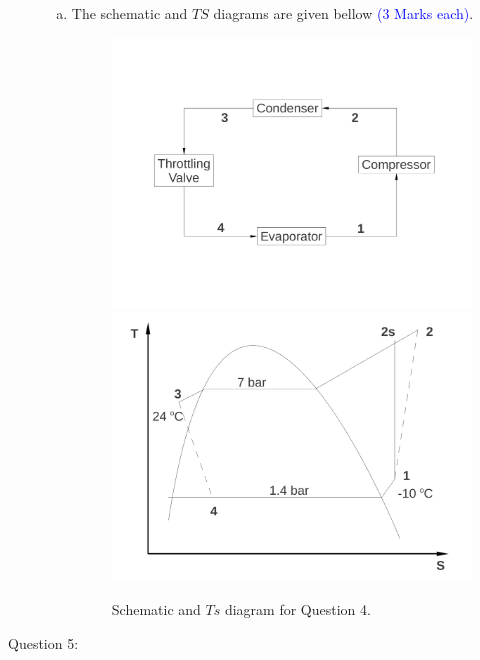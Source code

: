 \documentclass[12pt,twoside]{report}
\begin{document}
\begin{description}
\begin{enumerate}[(a)]
\item The schematic and $TS$ diagrams are given bellow \textcolor{blue}{(3 Marks each)}.%
\begin{figure}[h]
\begin{center}
\includegraphics[width=12.cm,angle=0,clip]{./Pics/Exam_Refrigeration3}
\includegraphics[width=8.cm,angle=0,clip]{./Pics/Exam_Refrigeration_TS}
\label{refri2}
\caption{Schematic and $Ts$ diagram for Question 4.}
\end{center}
\end{figure}

\medskip
\end{enumerate}


\clearpage
\item [Question 5:]


\end{description}
\end{document}
